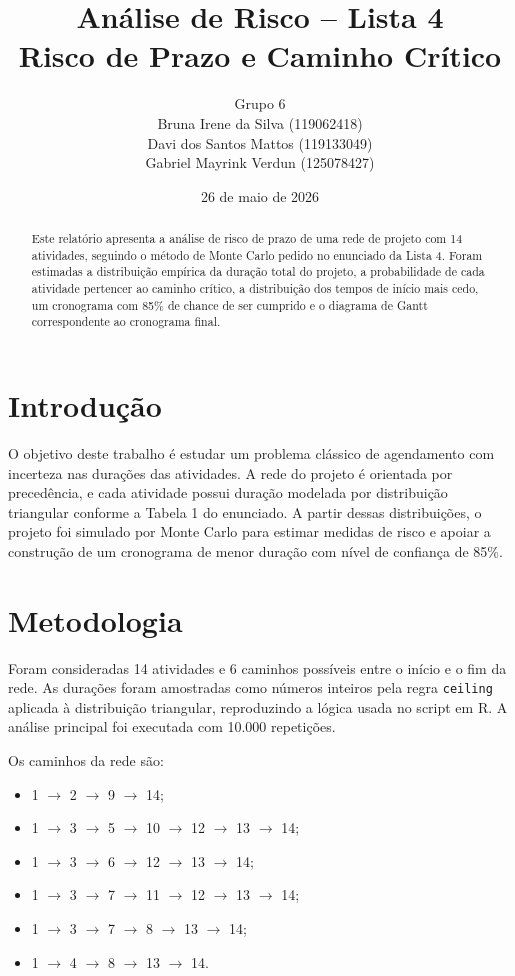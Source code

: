 \documentclass[12pt,a4paper]{article}
\title{\Large \textbf{Análise de Risco -- Lista 4} \\
       \large Risco de Prazo e Caminho Crítico}
\author{Grupo 6\\Bruna Irene da Silva (119062418)\\Davi dos Santos Mattos (119133049)\\Gabriel Mayrink Verdun (125078427)}
\date{26 de maio de 2026}
\begin{document}
\maketitle

\begin{abstract}
Este relatório apresenta a análise de risco de prazo de uma rede de projeto com 14 atividades, seguindo o método de Monte Carlo pedido no enunciado da Lista 4. Foram estimadas a distribuição empírica da duração total do projeto, a probabilidade de cada atividade pertencer ao caminho crítico, a distribuição dos tempos de início mais cedo, um cronograma com 85\% de chance de ser cumprido e o diagrama de Gantt correspondente ao cronograma final.
\end{abstract}

\section{Introdução}

O objetivo deste trabalho é estudar um problema clássico de agendamento com incerteza nas durações das atividades. A rede do projeto é orientada por precedência, e cada atividade possui duração modelada por distribuição triangular conforme a Tabela 1 do enunciado. A partir dessas distribuições, o projeto foi simulado por Monte Carlo para estimar medidas de risco e apoiar a construção de um cronograma de menor duração com nível de confiança de 85\%.

\section{Metodologia}

Foram consideradas 14 atividades e 6 caminhos possíveis entre o início e o fim da rede. As durações foram amostradas como números inteiros pela regra \texttt{ceiling} aplicada à distribuição triangular, reproduzindo a lógica usada no script em R. A análise principal foi executada com 10.000 repetições.

Os caminhos da rede são:
\begin{itemize}
    \item 1 $\rightarrow$ 2 $\rightarrow$ 9 $\rightarrow$ 14;
    \item 1 $\rightarrow$ 3 $\rightarrow$ 5 $\rightarrow$ 10 $\rightarrow$ 12 $\rightarrow$ 13 $\rightarrow$ 14;
    \item 1 $\rightarrow$ 3 $\rightarrow$ 6 $\rightarrow$ 12 $\rightarrow$ 13 $\rightarrow$ 14;
    \item 1 $\rightarrow$ 3 $\rightarrow$ 7 $\rightarrow$ 11 $\rightarrow$ 12 $\rightarrow$ 13 $\rightarrow$ 14;
    \item 1 $\rightarrow$ 3 $\rightarrow$ 7 $\rightarrow$ 8 $\rightarrow$ 13 $\rightarrow$ 14;
    \item 1 $\rightarrow$ 4 $\rightarrow$ 8 $\rightarrow$ 13 $\rightarrow$ 14.
\end{itemize}
\end{document}
